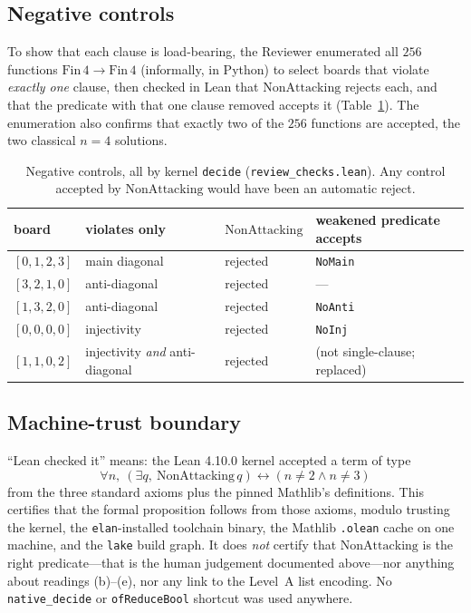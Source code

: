 \documentclass[11pt,a4paper]{article}
\theoremstyle{definition}
\theoremstyle{remark}
\newcommand{\lean}[1]{\texttt{#1}}
\newcommand{\Fin}{\mathrm{Fin}\,}
\newcommand{\NonAttacking}{\mathrm{NonAttacking}}
\begin{document}
\subsection{Negative controls}

To show that each clause is load-bearing, the Reviewer enumerated all $256$ functions
$\Fin 4\to\Fin 4$ (informally, in Python) to select boards that violate \emph{exactly one}
clause, then checked in Lean that $\NonAttacking$ rejects each, and that the predicate with
that one clause removed accepts it (Table~\ref{tab:controls}). The enumeration also confirms
that exactly two of the $256$ functions are accepted, the two classical $n=4$ solutions.

\begin{table}[ht]
\centering\small
\begin{tabular}{@{}llll@{}}
\toprule
board & violates only & $\NonAttacking$ & weakened predicate accepts \\
\midrule
$[0,1,2,3]$ & main diagonal & rejected & \lean{NoMain} \\
$[3,2,1,0]$ & anti-diagonal & rejected & --- \\
$[1,3,2,0]$ & anti-diagonal & rejected & \lean{NoAnti} \\
$[0,0,0,0]$ & injectivity & rejected & \lean{NoInj} \\
$[1,1,0,2]$ & injectivity \emph{and} anti-diagonal & rejected & (not single-clause; replaced) \\
\bottomrule
\end{tabular}
\caption{Negative controls, all by kernel \lean{decide} (\texttt{review\_checks.lean}).
Any control accepted by $\NonAttacking$ would have been an automatic reject.}
\label{tab:controls}
\end{table}

\subsection{Machine-trust boundary}

``Lean checked it'' means: the Lean 4.10.0 kernel accepted a term of type
\[\forall n,\ (\exists q,\ \NonAttacking\,q)\leftrightarrow(n\neq 2\wedge n\neq 3)\]
from the three standard axioms plus the pinned Mathlib's definitions. This certifies that the formal
proposition follows from those axioms, modulo trusting the kernel, the \lean{elan}-installed
toolchain binary, the Mathlib \texttt{.olean} cache on one machine, and the \lean{lake}
build graph. It does \emph{not} certify that $\NonAttacking$ is the right predicate---that
is the human judgement documented above---nor anything about readings (b)--(e), nor any
link to the Level~A list encoding. No \lean{native\_decide} or \lean{ofReduceBool}
shortcut was used anywhere.
\end{document}
